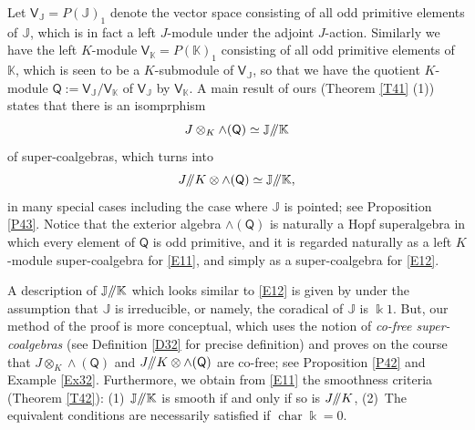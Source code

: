 \documentclass[11pt, a4paper]{amsart}
\theoremstyle{definition}
\numberwithin{equation}{section}
\begin{document}
Let $\mathsf{V}_{\mathbb{J}}=P(\mathbb{J})_1$ denote the vector space consisting of all 
odd primitive elements of $\mathbb{J}$, which is in fact a left $J$-module under the adjoint $J$-action.
Similarly we have the left $K$-module $\mathsf{V}_{\mathbb{K}}=P(\mathbb{K})_1$ consisting of all odd primitive elements
of $\mathbb{K}$, which is seen to be a $K$-submodule of $\mathsf{V}_{\mathbb{J}}$, so that we have the quotient
$K$-module 
$
\mathsf{Q}:=\mathsf{V}_{\mathbb{J}}/\mathsf{V}_{\mathbb{K}}
$
of $\mathsf{V}_{\mathbb{J}}$ by $\mathsf{V}_{\mathbb{K}}$. 
A main result of ours (Theorem \ref{T41} (1)) states that there is an isomprphism 
\begin{equation}\label{E11}
J\otimes_K\wedge(\mathsf{Q})\simeq \mathbb{J}/\hspace{-1mm}/\mathbb{K}
\end{equation}
of super-coalgebras, which turns into
\begin{equation}\label{E12}
J/\hspace{-1mm}/K\otimes \wedge(\mathsf{Q})\simeq \mathbb{J}/\hspace{-1mm}/\mathbb{K},
\end{equation}
in many special cases including the case where $\mathbb{J}$ is pointed; see Proposition \ref{P43}. 
Notice that the exterior algebra $\wedge(\mathsf{Q})$ is naturally a Hopf superalgebra in which every
element of $\mathsf{Q}$ is odd primitive, and it is regarded naturally as a left $K$-module super-coalgebra for  \eqref{E11}, and simply as a super-coalgebra for \eqref{E12}. 

A description of  $\mathbb{J}/\hspace{-1mm}/\mathbb{K}$ which looks similar to \eqref{E12} is given by
\cite[Proposition 3.14 (1)]{M2} under the assumption that $\mathbb{J}$ is irreducible, or namely,
the coradical of $\mathbb{J}$ is $\Bbbk 1$. But, our method of the proof is more conceptual, which uses the
notion of \emph{co-free super-coalgebras} (see Definition \ref{D32} for precise definition) and proves on the course 
that $J\otimes_K\wedge(\mathsf{Q})$ and $J/\hspace{-1mm}/K\otimes \wedge(\mathsf{Q})$ are co-free; see Proposition \ref{P42} and Example \ref{Ex32}. Furthermore, we obtain from \eqref{E11} 
the smoothness criteria (Theorem \ref{T42}):
(1)\ $\mathbb{J}/\hspace{-1mm}/\mathbb{K}$ is smooth if and only if so is $J/\hspace{-1mm}/K$, 
(2)\ The equivalent conditions are necessarily satisfied if $\operatorname{char}\Bbbk =0$. 
\end{document}
